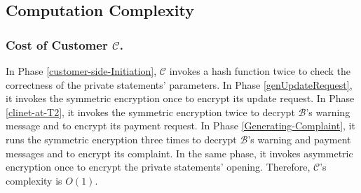 





%

\vspace{-1mm}

\subsection{Computation Complexity}  

\subsubsection{Cost of Customer $\mathcal{C}$.} 
%
In Phase \ref{customer-side-Initiation}, $\mathcal{C}$ invokes a hash function twice to check the correctness of the private statements' parameters. In Phase \ref{genUpdateRequest}, it invokes the symmetric encryption once to encrypt its update request. In Phase \ref{clinet-at-T2}, it invokes the symmetric encryption twice to decrypt $\mathcal{B}$'s warning message and to encrypt its payment request. In Phase \ref{Generating-Complaint}, it runs the symmetric encryption three times to decrypt $\mathcal{B}$'s warning and payment messages and to encrypt its complaint. In the same phase, it invokes asymmetric encryption once to encrypt the private statements' opening. Therefore, $\mathcal{C}$'s complexity   is  $O(1)$. 
\vspace{-1mm}
